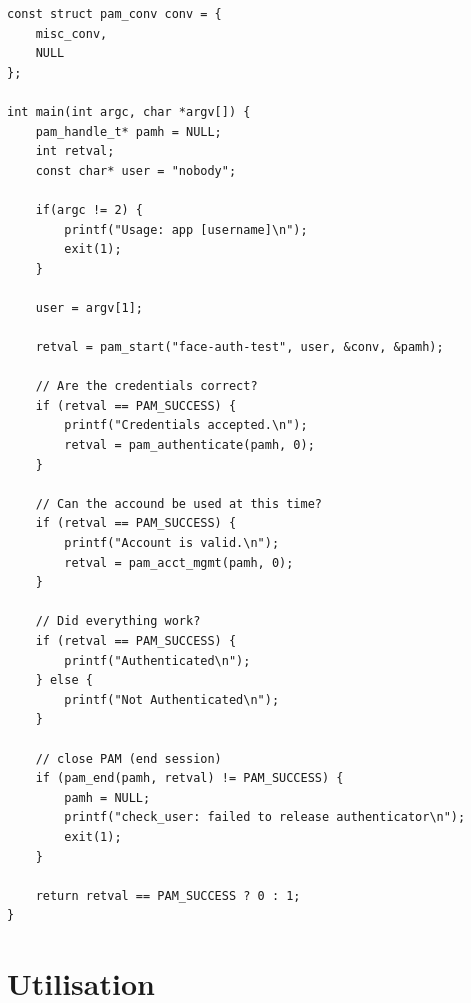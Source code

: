 \documentclass{article}
\begin{document}
\begin{itemize}
\begin{verbatim}
const struct pam_conv conv = {
	misc_conv,
	NULL
};

int main(int argc, char *argv[]) {
	pam_handle_t* pamh = NULL;
	int retval;
	const char* user = "nobody";

	if(argc != 2) {
		printf("Usage: app [username]\n");
		exit(1);
	}

	user = argv[1];

	retval = pam_start("face-auth-test", user, &conv, &pamh);

	// Are the credentials correct?
	if (retval == PAM_SUCCESS) {
		printf("Credentials accepted.\n");
		retval = pam_authenticate(pamh, 0);
	}

	// Can the accound be used at this time?
	if (retval == PAM_SUCCESS) {
		printf("Account is valid.\n");
		retval = pam_acct_mgmt(pamh, 0);
	}

	// Did everything work?
	if (retval == PAM_SUCCESS) {
		printf("Authenticated\n");
	} else {
		printf("Not Authenticated\n");
	}

	// close PAM (end session)
	if (pam_end(pamh, retval) != PAM_SUCCESS) {
		pamh = NULL;
		printf("check_user: failed to release authenticator\n");
		exit(1);
	}

	return retval == PAM_SUCCESS ? 0 : 1;
}
    \end{verbatim}
  \end{itemize}

  \section{Utilisation}
\end{document}
